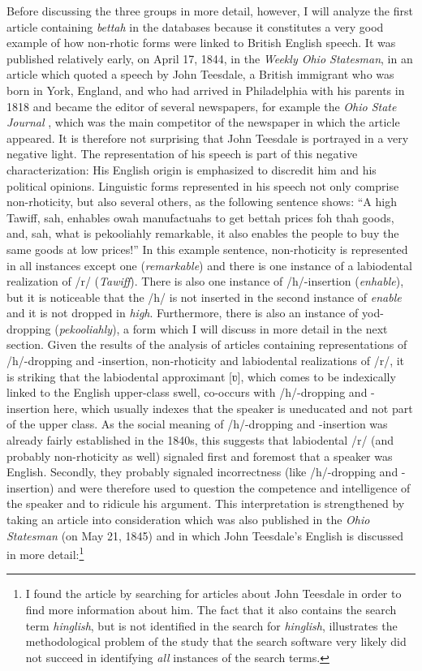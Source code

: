 Before discussing the three groups in more detail, however, I will analyze the first article containing \emph{bettah} in the databases because it constitutes a very good example of how non-rhotic forms were linked to British English speech. It was published relatively early, on April 17, 1844, in the \emph{Weekly Ohio Statesman}, in an article which quoted a speech by John Teesdale, a British immigrant who was born in York, England, and who had arrived in Philadelphia with his parents in 1818 and became the editor of several newspapers, for example the \emph{Ohio State Journal} \citep[526--527]{Snodgrass2008}, which was the main competitor of the newspaper in which the article appeared. It is therefore not surprising that John Teesdale is portrayed in a very negative light. The representation of his speech is part of this negative characterization: His English origin is emphasized to discredit him and his political opinions. Linguistic forms represented in his speech not only comprise non-rhoticity, but also several others, as the following sentence shows: “A high Tawiff, sah, enhables owah manufactuahs to get bettah prices foh thah goods, and, sah, what is pekooliahly remarkable, it also enables the people to buy the same goods at low prices!” In this example sentence, non-rhoticity is represented in all instances except one (\emph{remarkable}) and there is one instance of a labiodental realization of /r/ (\emph{Tawiff}). There is also one instance of /h/-insertion (\emph{enhable}), but it is noticeable that the /h/ is not inserted in the second instance of \emph{enable} and it is not dropped in \emph{high}. Furthermore, there is also an instance of yod-dropping (\emph{pekooliahly}), a form which I will discuss in more detail in the next section. Given the results of the analysis of articles containing representations of /h/-dropping and -insertion, non-rhoticity and labiodental realizations of /r/, it is striking that the labiodental approximant [ʋ], which comes to be indexically linked to the English upper-class swell, co-occurs with /h/-dropping and -insertion here, which usually indexes that the speaker is uneducated and not part of the upper class. As the social meaning of /h/-dropping and -insertion was already fairly established in the 1840s, this suggests that labiodental /r/ (and probably non-rhoticity as well) signaled first and foremost that a speaker was English. Secondly, they probably signaled incorrectness (like /h/-dropping and -insertion) and were therefore used to question the competence and intelligence of the speaker and to ridicule his argument. This interpretation is strengthened by taking an article into consideration which was also published in the \emph{Ohio Statesman} (on May 21, 1845) and in which John Teesdale’s English is discussed in more detail:\footnote{I found the article by searching for articles about John Teesdale in order to find more information about him. The fact that it also contains the search term \emph{hinglish}, but is not identified in the search for \emph{hinglish}, illustrates the methodological problem of the study that the search software very likely did not succeed in identifying \textit{all} instances of the search terms.}

